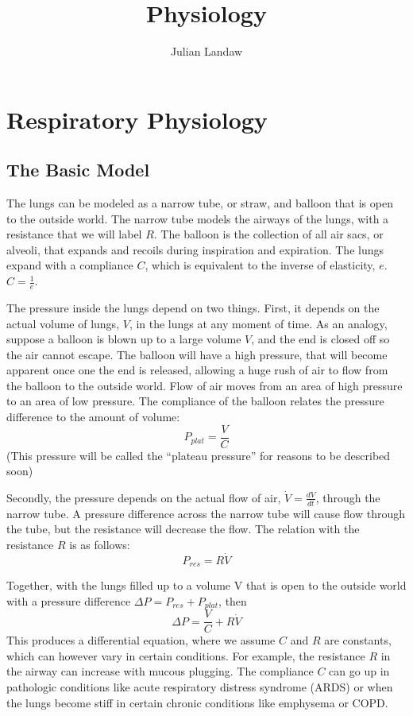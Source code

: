 \documentclass[10pt]{article}
\title{Physiology}
\author{Julian Landaw}
\begin{document}
\maketitle
\section{Respiratory Physiology}
\subsection{The Basic Model}
The lungs can be modeled as a narrow tube, or straw, and balloon that is open to the outside world. 
The narrow tube models the airways of the lungs, with a resistance that we will label $R$.
The balloon is the collection of all air sacs, or alveoli, that expands and recoils during inspiration and expiration. The lungs expand with a compliance $C$, which is equivalent to the inverse of elasticity, $e$. $C = \frac{1}{e}$.

The pressure inside the lungs depend on two things. First, it depends on the actual volume of lungs, $V$, in the lungs at any moment of time. As an analogy, suppose a balloon is blown up to a large volume $V$, and the end is closed off so the air cannot escape. The balloon will have a high pressure, that will become apparent once one the end is released, allowing a huge rush of air to flow from the balloon to the outside world. Flow of air moves from an area of high pressure to an area of low pressure. The compliance of the balloon relates the pressure difference to the amount of volume:
\begin{equation} \label{eq:plat}
P_{plat} = \frac{V}{C}
\end{equation}
(This pressure will be called the ``plateau pressure'' for reasons to be described soon)

Secondly, the pressure depends on the actual flow of air, $\dot V = \frac{d V}{d t}$, through the narrow tube. A pressure difference across the narrow tube will cause flow through the tube, but the resistance will decrease the flow. The relation with the resistance $R$ is as follows:
\begin{equation} \label{eq:res}
P_{res} = R\dot V
\end{equation}

Together, with the lungs filled up to a volume V that is open to the outside world with a pressure difference $\Delta P = P_{res} + P_{plat}$, then
\begin{equation} \label{eq:RCeq}
\Delta P = \frac{V}{C} + R\dot V
\end{equation}
This produces a differential equation, where we assume $C$ and $R$ are constants, which can however vary in certain conditions. For example, the resistance $R$ in the airway can increase with mucous plugging. The compliance $C$ can go up in pathologic conditions like acute respiratory distress syndrome (ARDS) or when the lungs become stiff in certain chronic conditions like emphysema or COPD. 
\end{document}
